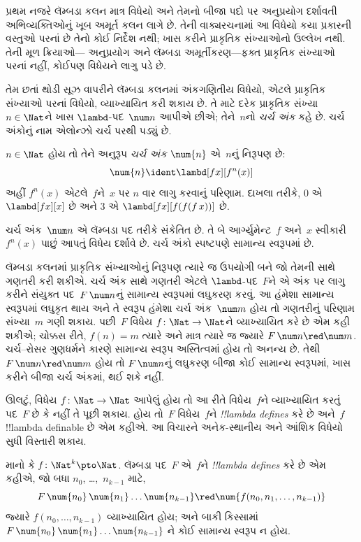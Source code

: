 \documentclass[../../../include/open-logic-section]{subfiles}
\begin{document}

પ્રથમ નજરે લૅમ્બડા કલન માત્ર વિધેયો અને તેમનો બીજા
પદો પર અનુપ્રયોગ દર્શાવતી અભિવ્યક્તિઓનું ખૂબ અમૂર્ત
કલન લાગે છે. તેની વાક્યરચનામાં આ વિધેયો કયા પ્રકારની
વસ્તુઓ પરનાં છે તેનો કોઈ નિર્દેશ નથી; ખાસ કરીને
પ્રાકૃતિક સંખ્યાઓનો ઉલ્લેખ નથી. તેની મૂળ ક્રિયાઓ—
અનુપ્રયોગ અને લૅમ્બડા અમૂર્તીકરણ—ફક્ત પ્રાકૃતિક
સંખ્યાઓ પરનાં નહીં, કોઈપણ વિધેયને લાગુ પડે છે.

તેમ છતાં થોડી સૂઝ વાપરીને લૅમ્બડા કલનમાં
અંકગણિતીય વિધેયો, એટલે પ્રાકૃતિક સંખ્યાઓ પરનાં
વિધેયો, વ્યાખ્યાયિત કરી શકાય છે. તે માટે દરેક
પ્રાકૃતિક સંખ્યા~$n \in \Nat$ને ખાસ
$\lambd$-પદ~$\num n$ આપીએ છીએ; તેને~$n$નો
\emph{ચર્ચ અંક} કહે છે. ચર્ચ અંકોનું નામ એલોન્ઝો
ચર્ચ પરથી પડ્યું છે.

\begin{defn}
  $n \in \Nat$ હોય તો તેને અનુરૂપ \emph{ચર્ચ અંક}
  $\num{n}$ એ~$n$નું નિરૂપણ છે:
  \[
    \num{n} \ident \lambd[fx][f^n(x)]
  \]
  અહીં $f^n(x)$ એટલે~$f$ને~$x$ પર $n$ વાર
  લાગુ કરવાનું પરિણામ. દાખલા તરીકે,
  $\num{0}$ એ $\lambd[fx][x]$ છે અને
  $\num{3}$ એ $\lambd[fx][f(f(f\,x))]$ છે.
\end{defn}
  
ચર્ચ અંક~$\num n$ એ લૅમ્બડા પદ તરીકે સંકેતિત
છે. તે બે આર્ગ્યુમેન્ટ~$f$ અને~$x$ સ્વીકારી
$f^n(x)$ પાછું આપતું વિધેય દર્શાવે છે. ચર્ચ
અંકો સ્પષ્ટપણે સામાન્ય સ્વરૂપમાં છે.

લૅમ્બડા કલનમાં પ્રાકૃતિક સંખ્યાઓનું નિરૂપણ ત્યારે જ
ઉપયોગી બને જો તેમની સાથે ગણતરી કરી શકીએ. ચર્ચ અંક
સાથે ગણતરી એટલે $\lambd$-પદ~$F$ને એ અંક પર
લાગુ કરીને સંયુક્ત પદ~$F\, \num n$નું સામાન્ય
સ્વરૂપમાં લઘુકરણ કરવું. આ હંમેશા સામાન્ય સ્વરૂપમાં
લઘુકૃત થાય અને તે સ્વરૂપ હંમેશા ચર્ચ અંક~$\num m$
હોય તો ગણતરીનું પરિણામ સંખ્યા~$m$ ગણી શકાય.
પછી~$F$ વિધેય $f\colon \Nat \to \Nat$ને
વ્યાખ્યાયિત કરે છે એમ કહી શકીએ; ચોક્કસ રીતે,
$f(n) = m$ ત્યારે અને માત્ર ત્યારે જ જ્યારે
$F\, \num n \red \num m$. ચર્ચ--રોસર ગુણધર્મને
કારણે સામાન્ય સ્વરૂપ અસ્તિત્વમાં હોય તો અનન્ય છે.
તેથી $F\, \num n \red \num m$ હોય તો
$F \, \num n$નું લઘુકરણ બીજા કોઈ સામાન્ય
સ્વરૂપમાં, ખાસ કરીને બીજા ચર્ચ અંકમાં, થઈ શકે નહીં.

ઊલટું, વિધેય $f\colon \Nat \to \Nat$ આપેલું હોય
તો આ રીતે વિધેય~$f$ને વ્યાખ્યાયિત કરતું પદ~$F$ છે કે
નહીં તે પૂછી શકાય. હોય તો~$F$ વિધેય~$f$ને
\emph{!!{lambda define}s} કરે છે અને~$f$
!!{lambda definable} છે એમ કહીએ. આ વિચારને
અનેક-સ્થાનીય અને આંશિક વિધેયો સુધી વિસ્તારી શકાય.

\begin{defn}
માનો કે $f\colon \Nat^k \pto \Nat$. લૅમ્બડા
પદ~$F$ એ~$f$ને \emph{!!{lambda define}s}
કરે છે એમ કહીએ, જો બધા
$n_0$, \dots,~$n_{k-1}$ માટે,
\[
F \, \num{n_0} \, \num{n_1} \dots \num{n_{k-1}} \red \num{f(n_0, n_1, \dots,
  n_{k-1})}
\]
જ્યારે $f(n_0, \dots, n_{k-1})$ વ્યાખ્યાયિત
હોય; અને બાકી કિસ્સામાં
$F \, \num{n_0} \, \num{n_1} \dots \num{n_{k-1}}$
ને કોઈ સામાન્ય સ્વરૂપ ન હોય.
\end{defn}
\end{document}
